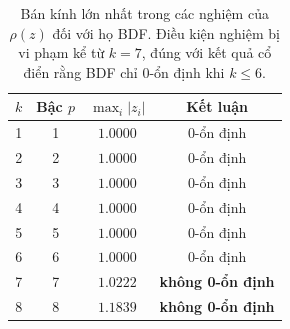 \begin{table}[H]
\centering
\caption{Bán kính lớn nhất trong các nghiệm của $\rho(z)$ đối với họ BDF. Điều kiện nghiệm bị vi phạm kể từ $k=7$, đúng với kết quả cổ điển rằng BDF chỉ 0-ổn định khi $k \leq 6$.}
\label{tab:bdf-stability}
\renewcommand{\arraystretch}{1.25}
\begin{tabular}{cccc}
\toprule
$k$ & Bậc $p$ & $\max_i |z_i|$ & Kết luận\\
\midrule
1 & 1 & $1.0000$ & 0-ổn định\\
2 & 2 & $1.0000$ & 0-ổn định\\
3 & 3 & $1.0000$ & 0-ổn định\\
4 & 4 & $1.0000$ & 0-ổn định\\
5 & 5 & $1.0000$ & 0-ổn định\\
6 & 6 & $1.0000$ & 0-ổn định\\
7 & 7 & $1.0222$ & \textbf{không 0-ổn định}\\
8 & 8 & $1.1839$ & \textbf{không 0-ổn định}\\
\bottomrule
\end{tabular}
\end{table}
